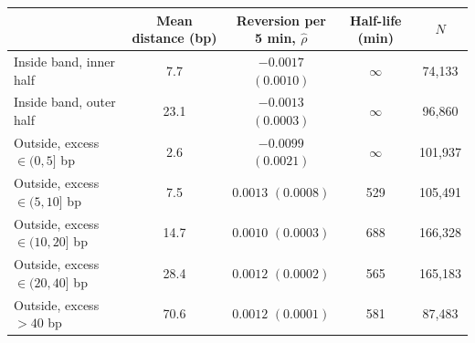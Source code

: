 \begin{tabular}{lcccc}
\toprule
 & Mean distance (bp) & Reversion per 5 min, $\hat\rho$ & Half-life (min) & $N$ \\
\midrule
Inside band, inner half & 7.7 & $-0.0017$ $(0.0010)$ & $\infty$ & 74,133 \\
Inside band, outer half & 23.1 & $-0.0013$ $(0.0003)$ & $\infty$ & 96,860 \\
Outside, excess $\in(0,5]$ bp & 2.6 & $-0.0099$ $(0.0021)$ & $\infty$ & 101,937 \\
Outside, excess $\in(5,10]$ bp & 7.5 & $0.0013$ $(0.0008)$ & 529 & 105,491 \\
Outside, excess $\in(10,20]$ bp & 14.7 & $0.0010$ $(0.0003)$ & 688 & 166,328 \\
Outside, excess $\in(20,40]$ bp & 28.4 & $0.0012$ $(0.0002)$ & 565 & 165,183 \\
Outside, excess $>40$ bp & 70.6 & $0.0012$ $(0.0001)$ & 581 & 87,483 \\
\bottomrule
\end{tabular}
